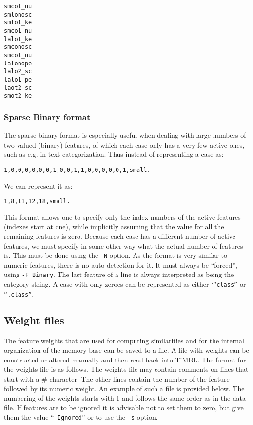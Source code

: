 \documentclass{report}
\begin{document}
\begin{footnotesize}
\begin{verbatim}
smco1_nu
smlonosc
smlo1_ke
smco1_nu
lalo1_ke
smconosc
smco1_nu
lalonope
lalo2_sc
lalo1_pe
laot2_sc
smot2_ke
\end{verbatim}
\end{footnotesize}

\subsubsection{Sparse Binary format}
\label{binaryformat}

The sparse binary format is especially useful when dealing with large
numbers of two-valued (binary) features, of which each case only has a
very few active ones, such as e.g. in text categorization. Thus
instead of representing a case as:

\begin{footnotesize}
\begin{verbatim}
1,0,0,0,0,0,0,1,0,0,1,1,0,0,0,0,0,1,small.
\end{verbatim}
\end{footnotesize}

We can represent it as:

\begin{footnotesize}
\begin{verbatim}
1,8,11,12,18,small.
\end{verbatim}
\end{footnotesize}

This format allows one to specify only the index numbers of the active
features (indexes start at one), while implicitly assuming that
the value for all the remaining features is zero. Because each case
has a different number of active features, we must specify in some
other way what the actual number of features is. This must be done
using the {\tt -N} option.  As the format is very similar to numeric
features, there is no auto-detection for it. It must always be
``forced'', using {\tt -F Binary}. The last feature of a line is
always interpreted as being the category string. A case with only
zeroes can be represented as either `{\tt ``class''} or {\tt ``,class''}.

\subsection{Weight files}
\label{weightformat}

The feature weights that are used for computing similarities and for
the internal organization of the memory-base can be saved to a file.
A file with weights can be constructed or altered manually and then
read back into TiMBL. The format for the weights file is as follows.
The weights file may contain comments on lines that start with a \#
character. The other lines contain the number of the feature followed
by its numeric weight. An example of such a file is provided
below. The numbering of the weights starts with 1 and follows the same
order as in the data file. If features are to be ignored it is
advisable not to set them to zero, but give them the value ``{\tt
Ignored}'' or to use the {\tt -s} option.
\end{document}
